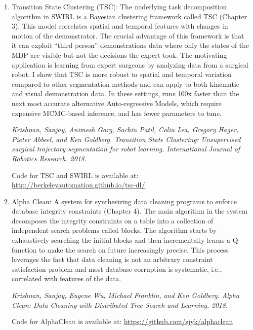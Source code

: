 \begin{enumerate}
    \item Transition State Clustering (TSC): The underlying task decomposition algorithm in SWIRL is a Bayesian clustering framework called TSC (Chapter 3). This model correlates spatial and temporal features with changes in motion of the demonstrator. The crucial advantage of this framework is that it can exploit ``third person'' demonstrations data where only the states of the MDP are visible but not the decisions the expert took. The motivating application is learning from expert surgeons by analyzing data from a surgical robot. I show that TSC is more robust to spatial and temporal variation compared to other segmentation methods and can apply to both kinematic and visual demonstration data. In these settings, \tsc runs 100x faster than the next most accurate alternative Auto-regressive Models, which require expensive MCMC-based inference, and has fewer parameters to tune.

    \emph{Krishnan, Sanjay, Animesh Garg, Sachin Patil, Colin Lea, Gregory Hager, Pieter Abbeel, and Ken Goldberg. Transition State Clustering: Unsupervised surgical trajectory segmentation for robot learning. International Journal of Robotics Research. 2018.}

    Code for TSC and SWIRL is available at: \url{http://berkeleyautomation.github.io/tsc-dl/}

    \item Alpha Clean: A system for synthesizing data cleaning programs to enforce database integrity constraints (Chapter 4). The main algorithm in the system decomposes the integrity constraints on a table into a collection of independent search problems called blocks. The algorithm starts by exhaustively searching the initial blocks and then incrementally learns a Q-function to make the search on future increasingly precise. This process leverages the fact that data cleaning is not an arbitrary constraint satisfaction problem and most database corruption is systematic, i.e., correlated with features of the data. 

     \emph{Krishnan, Sanjay, Eugene Wu, Michael Franklin, and Ken Goldberg. Alpha Clean: Data Cleaning with Distributed Tree Search and Learning. 2018.}

     Code for AlphaClean is available at: \url{https://github.com/sjyk/alphaclean}


\end{enumerate}

